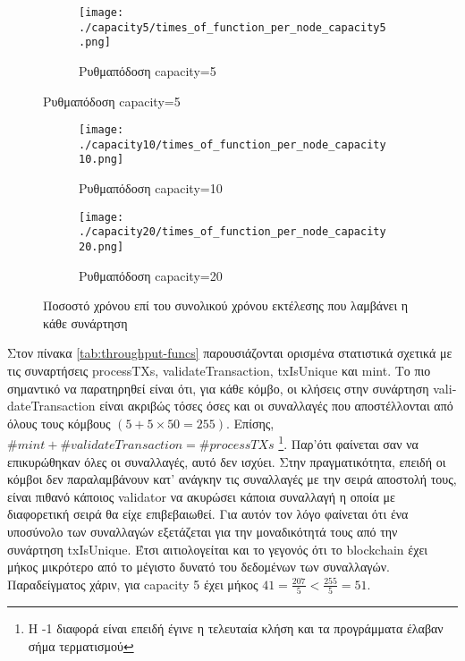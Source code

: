 \documentclass{article}
\newcommand{\eng}[1]{\foreignlanguage{english}{#1}} %
\begin{document}
\begin{figure}[ht]
    \centering
    \begin{subfigure}{\textwidth}
        \texttt{[image: ./capacity5/times\_of\_function\_per\_node\_capacity5.png]}
        \caption{Ρυθμαπόδοση \eng{capacity=5}}
    \end{subfigure}
\end{figure}
\begin{figure}[ht]
    \ContinuedFloat
    \begin{subfigure}{\textwidth}
        \texttt{[image: ./capacity10/times\_of\_function\_per\_node\_capacity10.png]}
        \caption{Ρυθμαπόδοση \eng{capacity=10}}
    \end{subfigure}
    \begin{subfigure}{\textwidth}
        \texttt{[image: ./capacity20/times\_of\_function\_per\_node\_capacity20.png]}
        \caption{Ρυθμαπόδοση \eng{capacity=20}}
    \end{subfigure}
    \caption{Ποσοστό χρόνου επί του συνολικού χρόνου εκτέλεσης που λαμβάνει η κάθε συνάρτηση}
\end{figure}
\FloatBarrier

Στον πίνακα \ref{tab:throughput-funcs} παρουσιάζονται ορισμένα στατιστικά
σχετικά με τις συναρτήσεις \eng{processTXs}, \eng{validateTransaction},
\eng{txIsUnique} και \eng{mint}. Το πιο σημαντικό να παρατηρηθεί είναι ότι, για
κάθε κόμβο, οι κλήσεις στην συνάρτηση \eng{validateTransaction} είναι ακριβώς
τόσες όσες και οι συναλλαγές που αποστέλλονται από όλους τους κόμβους $\left(5
+ 5 \times 50 = 255 \right)$. Επίσης, $\#mint + \#validateTransaction =
\#processTXs$ \footnote{Η -1 διαφορά είναι επειδή έγινε η τελευταία κλήση και τα
προγράμματα έλαβαν σήμα τερματισμού}. Παρ'ότι φαίνεται σαν να επικυρώθηκαν όλες
οι συναλλαγές, αυτό δεν ισχύει. Στην πραγματικότητα, επειδή οι κόμβοι δεν 
παραλαμβάνουν κατ' ανάγκην τις συναλλαγές με την σειρά αποστολή τους, είναι πιθανό
κάποιος \eng{validator} να ακυρώσει κάποια συναλλαγή η οποία με διαφορετική σειρά
θα είχε επιβεβαιωθεί. Για αυτόν τον λόγο φαίνεται ότι ένα υποσύνολο των
συναλλαγών εξετάζεται για την μοναδικότητά τους από την συνάρτηση
\eng{txIsUnique}. Έτσι αιτιολογείται και το γεγονός ότι το \eng{blockchain}
έχει μήκος μικρότερο από το μέγιστο δυνατό του δεδομένων των συναλλαγών.
Παραδείγματος χάριν, για \eng{capacity 5} έχει μήκος $41 = \frac{207}{5} <
\frac{255}{5} = 51$.

\end{document}
